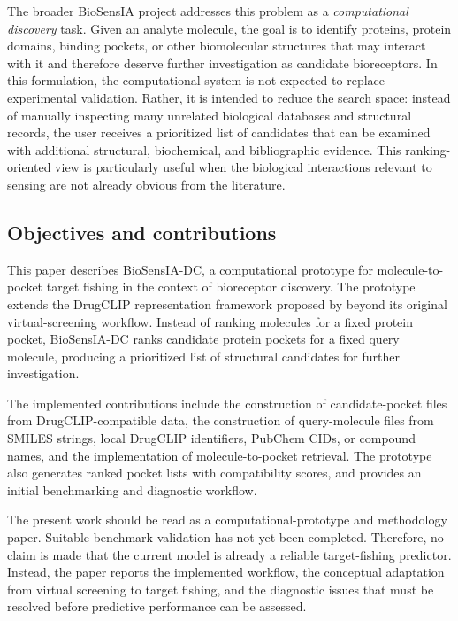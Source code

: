 \documentclass[12pt,fleqn]{article}
\begin{document}
The broader BioSensIA project addresses this problem as a
\emph{computational discovery} task. Given an analyte molecule, the
goal is to identify proteins, protein domains, binding pockets, or
other biomolecular structures that may interact with it and therefore
deserve further investigation as candidate bioreceptors. In this
formulation, the computational system is not expected to replace
experimental validation. Rather, it is intended to reduce the search
space: instead of manually inspecting many unrelated biological
databases and structural records, the user receives a prioritized list
of candidates that can be examined with additional structural,
biochemical, and bibliographic evidence. This ranking-oriented view is
particularly useful when the biological interactions relevant to
sensing are not already obvious from the literature.

\subsection{Objectives and contributions}

This paper describes BioSensIA-DC, a computational prototype for
molecule-to-pocket target fishing in the context of bioreceptor
discovery. The prototype extends the DrugCLIP representation framework
proposed by \cite{gao23:_drugc} beyond its original virtual-screening
workflow. Instead of ranking molecules for a fixed protein pocket,
BioSensIA-DC ranks candidate protein pockets for a fixed query
molecule, producing a prioritized list of structural candidates for
further investigation.

The implemented contributions include the construction of
candidate-pocket files from DrugCLIP-compatible data, the construction
of query-molecule files from SMILES strings, local DrugCLIP
identifiers, PubChem CIDs, or compound names, and the implementation
of molecule-to-pocket retrieval. The prototype also generates ranked
pocket lists with compatibility scores, and provides an initial
benchmarking and diagnostic workflow.

The present work should be read as a computational-prototype and
methodology paper. Suitable benchmark validation has not yet been
completed. Therefore, no claim is made that the current model is
already a reliable target-fishing predictor. Instead, the paper
reports the implemented workflow, the conceptual adaptation from
virtual screening to target fishing, and the diagnostic issues that
must be resolved before predictive performance can be assessed.
\end{document}
